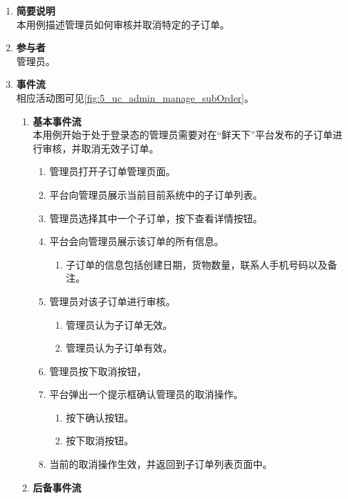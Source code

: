 \begin{enumerate}
	\item \textbf{简要说明}  \\ 本用例描述管理员如何审核并取消特定的子订单。
	\item \textbf{参与者} \\ 管理员。
	\item \textbf{事件流} \\ 相应活动图可见\autoref{fig:5_uc_admin_manage_subOrder}。
	\begin{enumerate} 
        \item \textbf{基本事件流} \\ 本用例开始于处于登录态的管理员需要对在“鲜天下”平台发布的子订单进行审核，并取消无效子订单。
        \begin{enumerate}
            \item 管理员打开子订单管理页面。
            \item 平台向管理员展示当前目前系统中的子订单列表。
            \item 管理员选择其中一个子订单，按下查看详情按钮。
            \item 平台会向管理员展示该订单的所有信息。
            \begin{enumerate}
                \item 子订单的信息包括创建日期，货物数量，联系人手机号码以及备注。
            \end{enumerate}
            \item 管理员对该子订单进行审核。
            \begin{enumerate}
                \item 管理员认为子订单无效。
                \item 管理员认为子订单有效。
            \end{enumerate}
            \item 管理员按下取消按钮，
            \item 平台弹出一个提示框确认管理员的取消操作。
            \begin{enumerate}
                \item 按下确认按钮。
                \item 按下取消按钮。
            \end{enumerate}
            \item 当前的取消操作生效，并返回到子订单列表页面中。
        \end{enumerate}
        \item \textbf{后备事件流}
        \begin{enumerate}

\end{enumerate}
\end{enumerate}
\end{enumerate}
